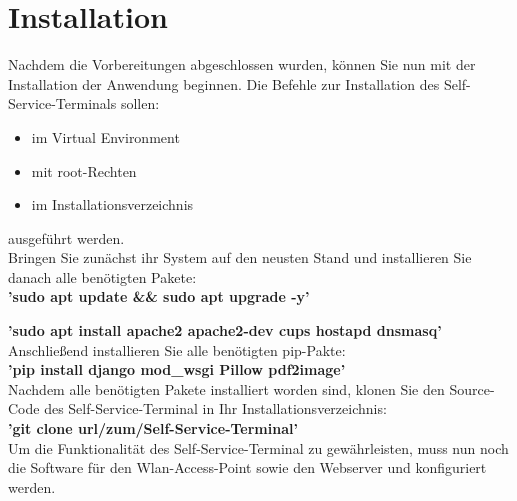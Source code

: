 \section{Installation}
Nachdem die Vorbereitungen abgeschlossen wurden, können Sie nun mit der Installation der Anwendung beginnen. Die Befehle zur Installation des Self-Service-Terminals sollen:

\begin{itemize}
    \item im Virtual Environment
    \item mit root-Rechten
    \item im Installationsverzeichnis
\end{itemize}

\noindent ausgeführt werden.\\

\noindent Bringen Sie zunächst ihr System auf den neusten Stand und installieren Sie danach alle benötigten Pakete:\\

\textbf{’sudo apt update \&\& sudo apt upgrade -y’}\par
\textbf{’sudo apt install apache2 apache2-dev cups hostapd dnsmasq’}\\

\noindent Anschließend installieren Sie alle benötigten pip-Pakte:\\

\textbf{’pip install django mod\_wsgi Pillow pdf2image’}\\

\noindent Nachdem alle benötigten Pakete installiert worden sind, klonen Sie den Source-Code des Self-Service-Terminal in Ihr Installationsverzeichnis:\\

\textbf{’git clone url/zum/Self-Service-Terminal’}\\

\noindent Um die Funktionalität des Self-Service-Terminal zu gewährleisten, muss nun noch die Software für den Wlan-Access-Point sowie den Webserver und konfiguriert werden.